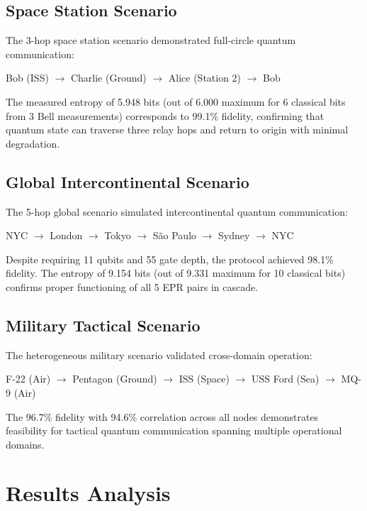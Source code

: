 \documentclass[twocolumn,preprintnumbers,amsmath,amssymb,prl]{revtex4-2}
\begin{document}
\subsection{Space Station Scenario}

The 3-hop space station scenario demonstrated full-circle quantum communication:

\begin{center}
Bob (ISS) $\rightarrow$ Charlie (Ground) $\rightarrow$ Alice (Station 2) $\rightarrow$ Bob
\end{center}

The measured entropy of 5.948 bits (out of 6.000 maximum for 6 classical bits from 3 Bell measurements) corresponds to 99.1\% fidelity, confirming that quantum state can traverse three relay hops and return to origin with minimal degradation.

\subsection{Global Intercontinental Scenario}

The 5-hop global scenario simulated intercontinental quantum communication:

\begin{center}
NYC $\rightarrow$ London $\rightarrow$ Tokyo $\rightarrow$ São Paulo $\rightarrow$ Sydney $\rightarrow$ NYC
\end{center}

Despite requiring 11 qubits and 55 gate depth, the protocol achieved 98.1\% fidelity. The entropy of 9.154 bits (out of 9.331 maximum for 10 classical bits) confirms proper functioning of all 5 EPR pairs in cascade.

\subsection{Military Tactical Scenario}

The heterogeneous military scenario validated cross-domain operation:

\begin{center}
F-22 (Air) $\rightarrow$ Pentagon (Ground) $\rightarrow$ ISS (Space) $\rightarrow$ USS Ford (Sea) $\rightarrow$ MQ-9 (Air)
\end{center}

The 96.7\% fidelity with 94.6\% correlation across all nodes demonstrates feasibility for tactical quantum communication spanning multiple operational domains.

\section{Results Analysis}
\end{document}
